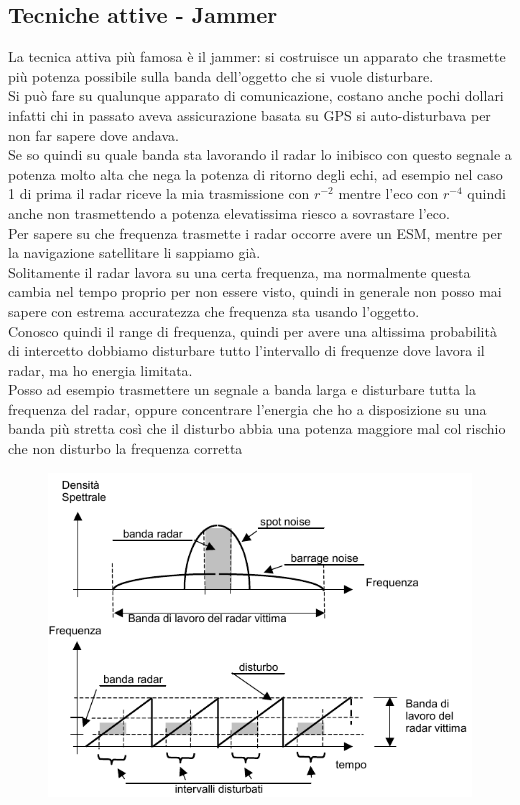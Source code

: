 \documentclass[oneside, 12pt]{extbook}
\begin{document}
\subsection{Tecniche attive - Jammer}
La tecnica attiva più famosa è il jammer: si costruisce un apparato che trasmette più potenza possibile sulla banda dell'oggetto che si vuole disturbare.\\
Si può fare su qualunque apparato di comunicazione, costano anche pochi dollari infatti chi in passato aveva assicurazione basata su GPS si auto-disturbava per non far sapere dove andava.\\
Se so quindi su quale banda sta lavorando il radar lo inibisco con questo segnale a potenza molto alta che nega la potenza di ritorno degli echi, ad esempio nel caso 1 di prima il radar riceve la mia trasmissione con $r^{-2}$ mentre l'eco con $r^{-4}$ quindi anche non trasmettendo a potenza elevatissima riesco a sovrastare l'eco.\\
Per sapere su che frequenza trasmette i radar occorre avere un ESM, mentre per la navigazione satellitare li sappiamo già.\\
Solitamente il radar lavora su una certa frequenza, ma normalmente questa cambia nel tempo proprio per non essere visto, quindi in generale non posso mai sapere con estrema accuratezza che frequenza sta usando l'oggetto.\\
Conosco quindi il range di frequenza, quindi per avere una altissima probabilità di intercetto dobbiamo disturbare tutto l'intervallo di frequenze dove lavora il radar, ma ho energia limitata.\\
Posso ad esempio trasmettere un segnale a banda larga e disturbare tutta la frequenza del radar, oppure concentrare l'energia che ho a disposizione su una banda più stretta così che il disturbo abbia una potenza maggiore mal col rischio che non disturbo la frequenza corretta\\
\begin{figure}[!h]
	\includegraphics[scale=0.5]{immagini/localization/jamming.png}
\end{figure}\\\\
\end{document}
